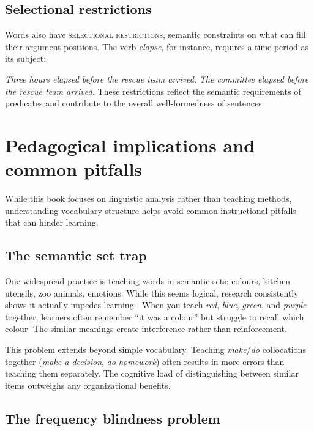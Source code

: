 \subsection{Selectional restrictions}

Words also have \textsc{selectional restrictions}, semantic constraints on what can fill their argument positions. The verb \textit{elapse}, for instance, requires a time period as its subject:

\ea
\ea \textit{Three hours elapsed before the rescue team arrived.}
\ex *\textit{The committee elapsed before the rescue team arrived.}
\z\z
These restrictions reflect the semantic requirements of predicates and contribute to the overall well-formedness of sentences.

\section{Pedagogical implications and common pitfalls}

While this book focuses on linguistic analysis rather than teaching methods, understanding vocabulary structure helps avoid common instructional pitfalls that can hinder learning.

\subsection{The semantic set trap}

One widespread practice is teaching words in semantic sets: colours, kitchen utensils, zoo animals, emotions. While this seems logical, research consistently shows it actually impedes learning \citep{finkbeiner2003semantic, waring1997negative}. When you teach \textit{red}, \textit{blue}, \textit{green}, and \textit{purple} together, learners often remember ``it was a colour'' but struggle to recall which colour. The similar meanings create interference rather than reinforcement.

This problem extends beyond simple vocabulary. Teaching \textit{make}/\textit{do} collocations together (\textit{make a decision}, \textit{do homework}) often results in more errors than teaching them separately. The cognitive load of distinguishing between similar items outweighs any organizational benefits.

\subsection{The frequency blindness problem}

